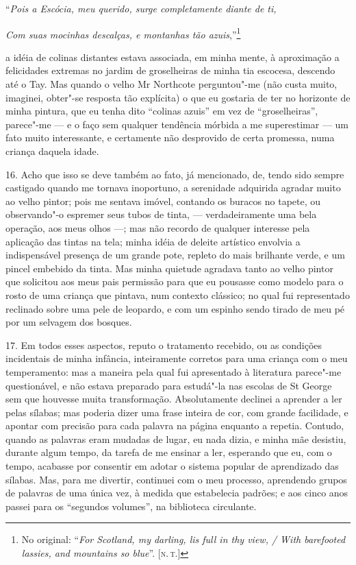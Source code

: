 ``\emph{Pois a Escócia, meu querido, surge completamente diante de ti,}

\emph{Com suas mocinhas descalças, e montanhas tão azuis},''\footnote{No
  original: ``\emph{For Scotland, my darling, lis full in thy view, /
  With barefooted lassies, and mountains so blue}''. {[}\textsc{n.\,t.}{]}}

a idéia de colinas distantes estava associada, em minha mente, à
aproximação a felicidades extremas no jardim de groselheiras de minha
tia escocesa, descendo até o Tay. Mas quando o velho Mr Northcote
perguntou"-me (não custa muito, imaginei, obter"-se resposta tão
explícita) o que eu gostaria de ter no horizonte de minha pintura, que
eu tenha dito ``colinas azuis'' em vez de ``groselheiras'', parece"-me ---
e o faço sem qualquer tendência mórbida a me superestimar --- um fato
muito interessante, e certamente não desprovido de certa promessa, numa
criança daquela idade.

16. Acho que isso se deve também ao fato, já mencionado, de, tendo sido
sempre castigado quando me tornava inoportuno, a serenidade adquirida
agradar muito ao velho pintor; pois me sentava imóvel, contando os
buracos no tapete, ou observando"-o espremer seus tubos de tinta, ---
verdadeiramente uma bela operação, aos meus olhos ---; mas não recordo de
qualquer interesse pela aplicação das tintas na tela; minha idéia de
deleite artístico envolvia a indispensável presença de um grande pote,
repleto do mais brilhante verde, e um pincel embebido da tinta. Mas
minha quietude agradava tanto ao velho pintor que solicitou aos meus
pais permissão para que eu pousasse como modelo para o rosto de uma
criança que pintava, num contexto clássico; no qual fui representado
reclinado sobre uma pele de leopardo, e com um espinho sendo tirado de
meu pé por um selvagem dos bosques.

17. Em todos esses aspectos, reputo o tratamento recebido, ou as
condições incidentais de minha infância, inteiramente corretos para uma
criança com o meu temperamento: mas a maneira pela qual fui apresentado
à literatura parece"-me questionável, e não estava preparado para
estudá"-la nas escolas de St George sem que houvesse muita transformação.
Absolutamente declinei a aprender a ler pelas sílabas; mas poderia dizer
uma frase inteira de cor, com grande facilidade, e apontar com precisão
para cada palavra na página enquanto a repetia. Contudo, quando as
palavras eram mudadas de lugar, eu nada dizia, e minha mãe desistiu,
durante algum tempo, da tarefa de me ensinar a ler, esperando que eu,
com o tempo, acabasse por consentir em adotar o sistema popular de
aprendizado das sílabas. Mas, para me divertir, continuei com o meu
processo, aprendendo grupos de palavras de uma única vez, à medida que
estabelecia padrões; e aos cinco anos passei para os ``segundos
volumes'', na biblioteca circulante.

